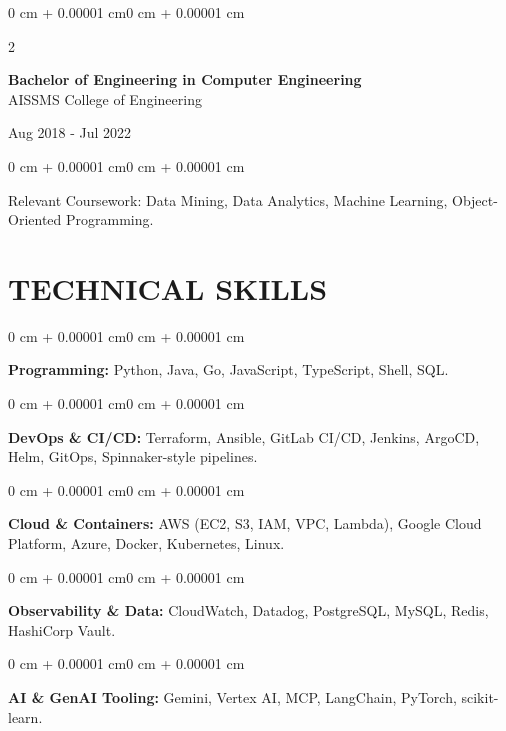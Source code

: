 \documentclass[10pt, letterpaper]{article}
\newenvironment{onecolentry}{
    \begin{adjustwidth}{0 cm + 0.00001 cm}{0 cm + 0.00001 cm}
}{
    \end{adjustwidth}
}
\newenvironment{twocolentry}[2][]{
    \onecolentry
    \def\secondColumn{#2}
    \setcolumnwidth{\fill, 4.5 cm}
    \begin{paracol}{2}
}{
    \switchcolumn \raggedleft \secondColumn
    \end{paracol}
    \endonecolentry
}
\begin{document}
\begin{twocolentry}{
    Aug 2018 - Jul 2022
}
    \textbf{Bachelor of Engineering in Computer Engineering} \\
    AISSMS College of Engineering
\end{twocolentry}
\begin{onecolentry}
Relevant Coursework: Data Mining, Data Analytics, Machine Learning, Object-Oriented Programming.
\end{onecolentry}
\section{TECHNICAL SKILLS}
\begin{onecolentry}
\textbf{Programming:} Python, Java, Go, JavaScript, TypeScript, Shell, SQL.
\end{onecolentry}
\vspace{0.06 cm}
\begin{onecolentry}
\textbf{DevOps \& CI/CD:} Terraform, Ansible, GitLab CI/CD, Jenkins, ArgoCD, Helm, GitOps, Spinnaker-style pipelines.
\end{onecolentry}
\vspace{0.06 cm}
\begin{onecolentry}
\textbf{Cloud \& Containers:} AWS (EC2, S3, IAM, VPC, Lambda), Google Cloud Platform, Azure, Docker, Kubernetes, Linux.
\end{onecolentry}
\vspace{0.06 cm}
\begin{onecolentry}
\textbf{Observability \& Data:} CloudWatch, Datadog, PostgreSQL, MySQL, Redis, HashiCorp Vault.
\end{onecolentry}
\vspace{0.06 cm}
\begin{onecolentry}
\textbf{AI \& GenAI Tooling:} Gemini, Vertex AI, MCP, LangChain, PyTorch, scikit-learn.
\end{onecolentry}

\end{document}
